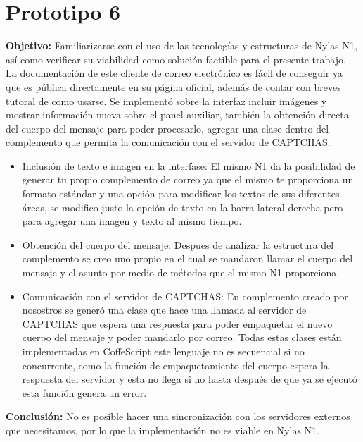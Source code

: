 \section{Prototipo 6}
\textbf{Objetivo:} Familiarizarse con el uso de las tecnologías y estructuras de Nylas N1, así como verificar su viabilidad como solución factible para el presente trabajo.\\
La documentación de este cliente de correo electrónico es fácil de conseguir ya que es pública directamente en su página oficial, además de contar con breves tutoral de como usarse.
Se implementó sobre la interfaz incluir imágenes y mostrar información nueva sobre el panel auxiliar, también la obtención directa del cuerpo del mensaje para poder procesarlo, agregar una clase dentro del complemento que permita la comunicación con el servidor de CAPTCHAS.

\begin{itemize}
 \item Inclusión de texto e imagen en la interfase: El mismo N1 da la posibilidad de generar tu propio complemento de correo ya que el mismo te proporciona un formato estándar y una opción para modificar los textos de sus diferentes áreas, se modifico justo la opción de texto en la barra lateral derecha pero para agregar una imagen y texto al mismo tiempo.
 \item Obtención del cuerpo del mensaje: Despues de analizar la estructura del complemento se creo uno propio en el cual se mandaron llamar el cuerpo del mensaje y el asunto por medio de métodos que el mismo N1 proporciona.
 \item Comunicación con el servidor de CAPTCHAS: En complemento creado por nosostros se generó una clase que hace una llamada al servidor de CAPTCHAS que espera una respuesta para poder empaquetar el nuevo cuerpo del mensaje y poder mandarlo por correo. Todas estas clases están implementadas en CoffeScript este lenguaje no es secuencial si no concurrente, como la función de empaquetamiento del cuerpo espera la respuesta del servidor y esta no llega si no hasta después de que ya se ejecutó esta función genera un error.
\end{itemize}
\textbf{Conclusión:} No es posible hacer una sincronización con los servidores externos que necesitamos, por lo que la implementación no es viable en Nylas N1.

